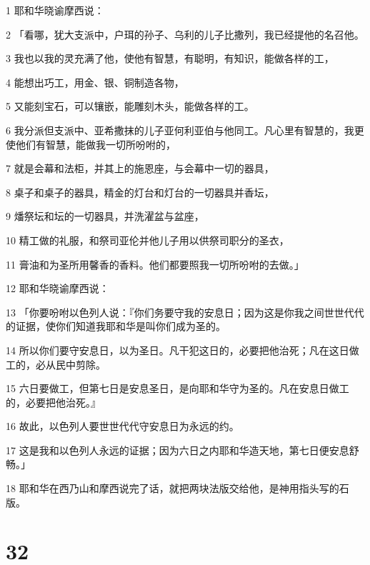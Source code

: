 \par 1 耶和华晓谕摩西说：
\par 2 「看哪，犹大支派中，户珥的孙子、乌利的儿子比撒列，我已经提他的名召他。
\par 3 我也以我的灵充满了他，使他有智慧，有聪明，有知识，能做各样的工，
\par 4 能想出巧工，用金、银、铜制造各物，
\par 5 又能刻宝石，可以镶嵌，能雕刻木头，能做各样的工。
\par 6 我分派但支派中、亚希撒抹的儿子亚何利亚伯与他同工。凡心里有智慧的，我更使他们有智慧，能做我一切所吩咐的，
\par 7 就是会幕和法柜，并其上的施恩座，与会幕中一切的器具，
\par 8 桌子和桌子的器具，精金的灯台和灯台的一切器具并香坛，
\par 9 燔祭坛和坛的一切器具，并洗濯盆与盆座，
\par 10 精工做的礼服，和祭司亚伦并他儿子用以供祭司职分的圣衣，
\par 11 膏油和为圣所用馨香的香料。他们都要照我一切所吩咐的去做。」
\par 12 耶和华晓谕摩西说：
\par 13 「你要吩咐以色列人说：『你们务要守我的安息日；因为这是你我之间世世代代的证据，使你们知道我耶和华是叫你们成为圣的。
\par 14 所以你们要守安息日，以为圣日。凡干犯这日的，必要把他治死；凡在这日做工的，必从民中剪除。
\par 15 六日要做工，但第七日是安息圣日，是向耶和华守为圣的。凡在安息日做工的，必要把他治死。』
\par 16 故此，以色列人要世世代代守安息日为永远的约。
\par 17 这是我和以色列人永远的证据；因为六日之内耶和华造天地，第七日便安息舒畅。」
\par 18 耶和华在西乃山和摩西说完了话，就把两块法版交给他，是神用指头写的石版。

\chapter{32}

